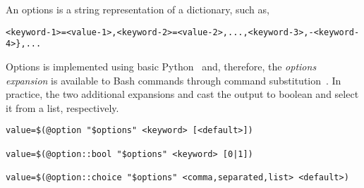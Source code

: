 
An options is a string representation of a dictionary, such as,
%
\begin{verbatim}
<keyword-1>=<value-1>,<keyword-2>=<value-2>,...,<keyword-3>,-<keyword-4>},...
\end{verbatim}
%
Options is implemented using basic Python~ and, therefore, the \emph{options expansion} is available to Bash commands through command substitution~\cite{command_substitution}. In practice, the two additional expansions  and  cast the output to boolean and select it from a list, respectively.
%
\begin{verbatim}
value=$(@option "$options" <keyword> [<default>])

value=$(@option::bool "$options" <keyword> [0|1])

value=$(@option::choice "$options" <comma,separated,list> <default>)
\end{verbatim}
